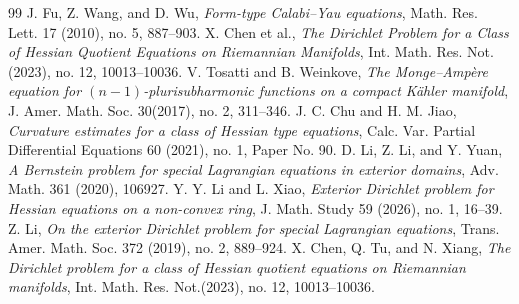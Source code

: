 \documentclass[reqno,a4paper]{amsart}
\numberwithin{equation}{section}
\begin{document}
\begin{thebibliography}{99}
		 J. Fu, Z. Wang, and D. Wu, \emph{Form-type Calabi--Yau equations}, Math. Res. Lett. 17 (2010), no. 5, 887--903.
		 X. Chen et al., \emph{The Dirichlet Problem for a Class of Hessian Quotient Equations on Riemannian Manifolds}, Int. Math. Res. Not.  (2023), no. 12, 10013--10036.
		 V. Tosatti and B. Weinkove, \emph{The Monge--Amp\`ere equation for $(n-1)$-plurisubharmonic functions on a compact K\"ahler manifold}, J. Amer. Math. Soc. 30(2017), no. 2, 311--346.
		 J. C. Chu and H. M. Jiao, \emph{Curvature estimates for a class of Hessian type equations}, Calc. Var. Partial Differential Equations 60 (2021), no. 1, Paper No. 90.
		 D. Li, Z. Li, and Y. Yuan, \emph{A Bernstein problem for special Lagrangian equations in exterior domains}, Adv. Math. 361 (2020), 106927.
		 Y. Y. Li and L. Xiao, \emph{Exterior Dirichlet problem for Hessian equations on a non-convex ring}, J. Math. Study 59 (2026), no. 1, 16--39.
		 Z. Li, \emph{On the exterior Dirichlet problem for special Lagrangian equations}, Trans. Amer. Math. Soc. 372 (2019), no. 2, 889--924.
		 X. Chen, Q. Tu, and N. Xiang, \emph{The Dirichlet problem for a class of Hessian quotient equations on Riemannian manifolds}, Int. Math. Res. Not.(2023), no. 12, 10013--10036.
	\end{thebibliography}
	
\end{document}
